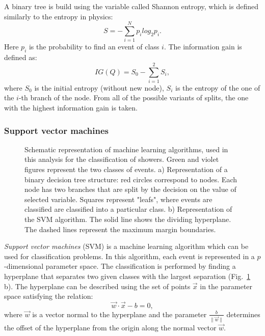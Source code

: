 A binary tree is build using the variable called Shannon entropy\cite{ShannonEntropy}, which is defined similarly to the entropy in physics:
\begin{equation}
S=- \sum_{i=1}^{N} p_i log_2 p_i.
\end{equation}
Here $p_i$ is the probability to find an event of class $i$. The information gain is defined as:
\begin{equation}
IG(Q) = S_0 - \sum_{i=1}^{2}S_i,
\end{equation}
where $S_0$ is the initial entropy (without new node), $S_i$ is the entropy of the one of the $i$-th branch of the node. From all of the possible variants of splits, the one with the highest information gain is taken. 

\subsubsection{Support vector machines}

\begin{figure}[!tbp]
\begin{minipage}[h]{0.49\linewidth}
\end{minipage}
\hfill
\begin{minipage}[h]{0.49\linewidth}
\end{minipage}
\caption{Schematic representation of machine learning algorithms, used in this analysis for the classification of showers. Green  and violet figures represent the two classes of events.
a) Representation of a binary decision tree structure: red circles correspond to nodes. Each node has two branches that are split by the decision on the value of selected variable. Squares represent "leafs", where events are classified are classified into a particular class.
b) Representation of the SVM algorithm. The solid line shows the dividing hyperplane. The dashed lines represent the maximum margin boundaries.}
\label{fig:MLAlgo}
\end{figure}

\textit{Support vector machines} (SVM)\cite{VapLer63} is a machine learning algorithm which can be used for classification problems. In this algorithm, each event is represented in a $p$-dimensional parameter space. The classification is performed by finding a hyperplane that separates two given classes with the largest separation (Fig.~\ref{fig:MLAlgo} b). The hyperplane can be described using the set of points $\vec {x}$ in the parameter space satisfying the relation:
\begin{equation}
\vec{w}\cdot \vec{x} - b = 0,
\end{equation}
where $\vec{w}$ is a vector normal to the hyperplane and the parameter $\frac {b}{\|{\vec {w}}\|}$ determines the offset of the hyperplane from the origin along the normal vector $\vec {w}$. 

